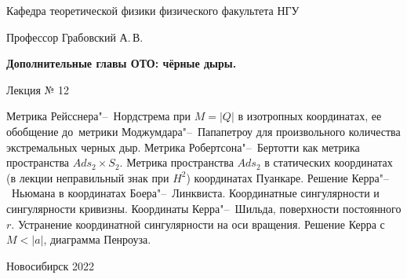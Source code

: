 \documentclass[12pt,pagesize,paper=192mm:108mm,landscape]{scrbook}
\begin{document}
\begin{titlepage}
\begin{center}
    Кафедра теоретической физики физического факультета НГУ
    \medskip

    \Large
    Профессор Грабовский А.\,В.
    \smallskip

    \Large
    \textbf{Дополнительные главы ОТО: чёрные дыры.}
    \smallskip

    \Large
    Лекция № 12
    \vfill

    \normalsize
    \begin{minipage}{0.85\linewidth}
      Метрика Рейсснера"--~Нордстрема при $M=|Q|$ в изотропных координатах,
      ее обобщение до~метрики Моджумдара"--~Папапетроу для
      произвольного количества экстремальных черных дыр. Метрика
      Робертсона"--~Бертотти как метрика пространства $Ads_2\times S_2$. Метрика
      пространства $Ads_2$ в статических координатах (в лекции
      неправильный знак при $H^2$) координатах Пуанкаре. Решение
      Керра"--~Ньюмана в координатах Боера"--~Линквиста. Координатные
      сингулярности и сингулярности кривизны. Координаты Керра"--~Шильда,
      поверхности постоянного $r$. Устранение координатной сингулярности
      на оси вращения. Решение Керра с $M < |a|$, диаграмма Пенроуза.
     \end{minipage}
    \vfill

    \normalsize \ccbysa\hspace{0.5em}  Новосибирск 2022
  \end{center}
\end{titlepage}
\end{document}
